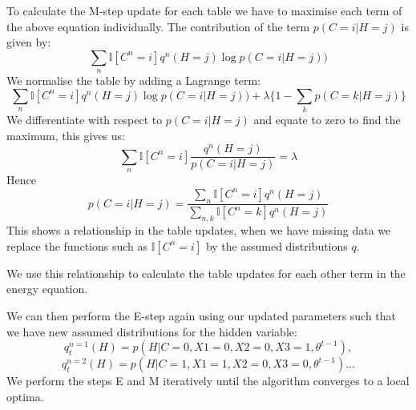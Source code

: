 \documentclass[12pt]{article} %
\begin{document}
To calculate the M-step update for each table we have to maximise each term of the above equation individually. The contribution of the term $p(C=i|H=j)$ is given by:
$$
\displaystyle\sum_{n}\mathbb{I}[C^n=i]q^n(H=j) \log p(C=i|H=j))
$$
We normalise the table by adding a Lagrange term:
$$
\displaystyle\sum_{n}\mathbb{I}[C^n=i]q^n(H=j) \log p(C=i|H=j))
+ \lambda\{1-\sum_{k}p(C=k|H=j)\}
$$
We differentiate with respect to $p(C=i|H=j)$ and equate to zero to find the maximum, this gives us:
$$
\displaystyle\sum_{n}\mathbb{I}[C^n=i] \frac{q^n(H=j)}{p(C=i|H=j)} = \lambda
$$
Hence
$$
p(C=i|H=j)=
\frac{\sum_{n}\mathbb{I}[C^n=i]q^n(H=j)}{\sum_{n,k}\mathbb{I}[C^n=k]q^n(H=j)}
$$
This shows a relationship in the table updates, when we have missing data we replace the functions such as $\mathbb{I}[C^n=i]$ by the assumed distributions $q$.

We use this relationship to calculate the table updates for each other term in the energy equation.

We can then perform the E-step again using our updated parameters such that we have new assumed distributions for the hidden variable:
$$
q_{t}^{n=1}(H)=p(H|C=0,X1=0,X2=0,X3=1,\theta^{t-1}),
$$
$$
q_{t}^{n=2}(H)=p(H|C=1,X1=1,X2=0,X3=0,\theta^{t-1})...
$$
We perform the steps E and M iteratively until the algorithm converges to a local optima.
\end{document}
